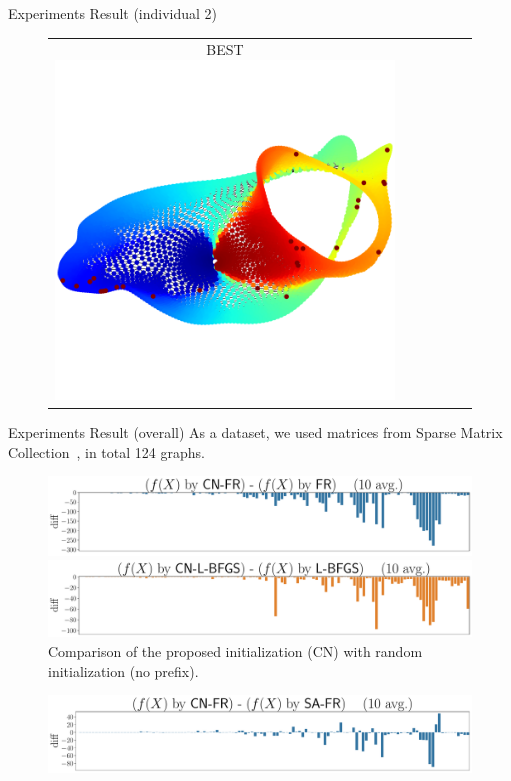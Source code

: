 \documentclass[dvipdfmx,13pt,aspectratio=169]{beamer}
\newif\ifShowHidden
\begin{document}
\begin{frame}{Experiments Result (individual 2)}
\begin{figure}[h]
\begin{tabular}{cccccc}
        \makecell{\small{\textsf{BEST}}                                                                                                                      \\[-0.2em]\includegraphics[width=0.135\columnwidth]{../main/individual/vis/opt_3elt.png}} \\
      \end{tabular}
    \end{figure}
  \end{frame}
\fi

\ifShowHidden
  \begin{frame}{Experiments Result (overall)}
    As a dataset, we used matrices from Sparse Matrix Collection~\cite{davis2011university}, in total 124 graphs.
    \begin{figure}[h]
      \centering
      \begin{minipage}{0.5\columnwidth}
        \centering
        \includegraphics[width=\columnwidth]{../main/overall/plot/diff_FR_50.pdf}
      \end{minipage}%
      \begin{minipage}{0.5\columnwidth}
        \centering
        \includegraphics[width=\columnwidth]{../main/overall/plot/diff_L-BFGS_50.pdf}
      \end{minipage}%
      \caption{
        Comparison of the proposed initialization (\textsf{CN}) with random initialization (no prefix).
      }
      \label{fig:overall}
    \end{figure}
    \begin{figure}[h]
      \centering
      \begin{minipage}{0.5\columnwidth}
        \centering
        \includegraphics[width=\columnwidth]{../main/circle/plot/diff_FR_50.pdf}

\end{minipage}
\end{figure}
\end{frame}
\end{document}
